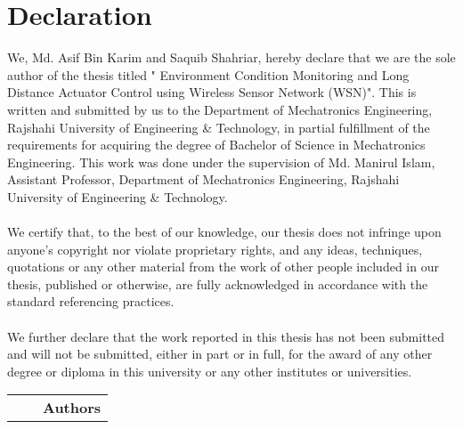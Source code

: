 \chapter*{\textbf{Declaration}}
We, Md. Asif Bin Karim and Saquib Shahriar, hereby declare that we are the sole author of the thesis titled " Environment Condition Monitoring and Long Distance Actuator Control using Wireless Sensor Network (WSN)". This is written and submitted by us to the Department of Mechatronics Engineering, Rajshahi University of Engineering \& Technology, in partial fulfillment of the requirements for acquiring the degree of Bachelor of Science in Mechatronics Engineering. This work was done under the supervision of Md. Manirul Islam, Assistant Professor, Department of Mechatronics Engineering, Rajshahi University of Engineering \& Technology.\\\\
We certify that, to the best of our knowledge, our thesis does not infringe upon anyone’s copyright nor violate proprietary rights, and any ideas, techniques, quotations or any other material from the work of other people included in our thesis, published or otherwise, are fully acknowledged in accordance with the standard referencing practices.\\\\
We further declare that the work reported in this thesis has not been submitted and will not be submitted, either in part or in full, for the award of any other degree or diploma in this university or any other institutes or universities.


\vspace{3cm}
\hspace{-0.9cm}
\begin{tabular}{p{}cp{}}
 && \textbf{\Large Authors}\\
\end{tabular} 
